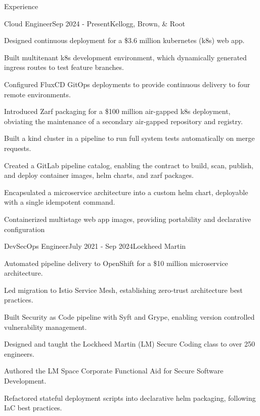 \documentclass[
	a4paper, %
	11pt, %
]{resume} %
\begin{document}
\begin{rSection}{Experience}

	\begin{rSubsection}{Cloud Engineer}{Sep 2024 - Present}{Kellogg, Brown, \& Root}
		\item Designed continuous deployment for a \$3.6 million kubernetes (k8s) web app.
		\item Built multitenant k8s development environment, which dynamically generated ingress routes to test feature branches.
		\item Configured FluxCD GitOps deployments to provide continuous delivery to four remote environments.
		\item Introduced Zarf packaging for a \$100 million air-gapped k8s deployment, obviating the maintenance of a secondary air-gapped repository and registry.
		\item Built a kind cluster in a pipeline to run full system tests automatically on merge requests.
		\item Created a GitLab pipeline catalog, enabling the contract to build, scan, publish, and deploy container images, helm charts, and zarf packages.
		\item Encapsulated a microservice architecture into a custom helm chart, deployable with a single idempotent command.
		\item Containerized multistage web app images, providing portability and declarative configuration
	\end{rSubsection}
	\begin{rSubsection}{DevSecOps Engineer}{July 2021 - Sep 2024}{Lockheed Martin}
		\item Automated pipeline delivery to OpenShift for a \$10 million microservice architecture.
		\item Led migration to Istio Service Mesh, establishing zero-trust architecture best practices.
		\item Built Security as Code pipeline with Syft and Grype, enabling version controlled vulnerability management.
		\item Designed and taught the Lockheed Martin (LM) Secure Coding class to over 250 engineers.
		\item Authored the LM Space Corporate Functional Aid for Secure Software Development.
		\item Refactored stateful deployment scripts into declarative helm packaging, following IaC best practices.

\end{rSubsection}
\end{rSection}
\end{document}
